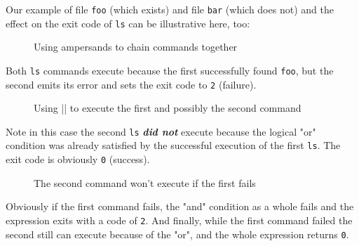 \documentclass[10pt,american,]{book}
\newenvironment{Shaded}{\begin{snugshade}}{\end{snugshade}}
\newcommand{\KeywordTok}[1]{\textcolor[rgb]{0.13,0.29,0.53}{\textbf{{#1}}}}
\newcommand{\OtherTok}[1]{\textcolor[rgb]{0.56,0.35,0.01}{{#1}}}
\newcommand{\NormalTok}[1]{{#1}}
\numberwithin{figure}{chapter}
\DeclareRobustCommand{\drcap}[1]{\begin{figure}[H]\caption{#1}\end{figure}}
\renewcommand{\KeywordTok}[1]{{#1}}
\renewcommand{\OtherTok}[1]{{#1}}
\renewcommand{\NormalTok}[1]{{#1}}
\begin{document}
Our example of file \texttt{foo} (which exists) and file \texttt{bar}
(which does not) and the effect on the exit code of \texttt{ls} can be
illustrative here, too:

\drcap{Using ampersands to chain commands together}

\begin{Shaded}
\end{Shaded}

Both \texttt{ls} commands execute because the first successfully found
\texttt{foo}, but the second emits its error and sets the exit code to
\texttt{2} (failure).

\drcap{Using || to execute the first and possibly the second command}

\begin{Shaded}
\end{Shaded}

Note in this case the second \texttt{ls} \textbf{\emph{did not}} execute
because the logical "or" condition was already satisfied by the
successful execution of the first \texttt{ls}. The exit code is
obviously \texttt{0} (success).

\drcap{The second command won't execute if the first fails}

\begin{Shaded}
\end{Shaded}

Obviously if the first command fails, the "and" condition as a whole
fails and the expression exits with a code of \texttt{2}. And finally,
while the first command failed the second still can execute because of
the "or", and the whole expression returns \texttt{0}.
\end{document}
